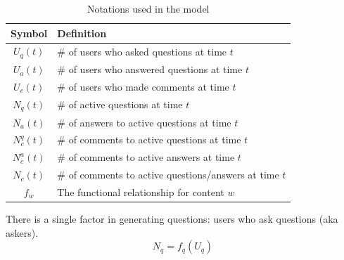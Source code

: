 \begin{table}[thb]
	\vspace{-0.5\baselineskip}
	\caption{Notations used in the model}
    \vspace{-\baselineskip}
    \label{tab:notations}
	\begin{center}    
	\begin{tabular}{cl}
	\toprule Symbol & Definition\\ \midrule
	$U_q(t)$ & \# of users who asked questions at time $t$\\ 
	$U_a(t)$ & \# of users who answered questions at time $t$\\
	$U_c(t)$ & \# of users who made comments at time $t$\\
	$N_q(t)$ & \# of active questions at time $t$\\
	$N_a(t)$ & \# of answers to active questions at time $t$\\
	$N_c^q(t)$ & \# of comments to active questions at time $t$\\
	$N_c^a(t)$ & \# of comments to active answers at time $t$\\
    $N_c(t)$ & \# of comments to active questions/answers at time $t$\\
	$f_w$ & The functional relationship for content $w$\\ \bottomrule
	\end{tabular}
    \end{center}
    \vspace{-\baselineskip}   
\end{table}

There is a single factor in generating questions: users who ask questions (aka askers).
\begin{equation*}
N_q = f_q(U_q)
\end{equation*}

